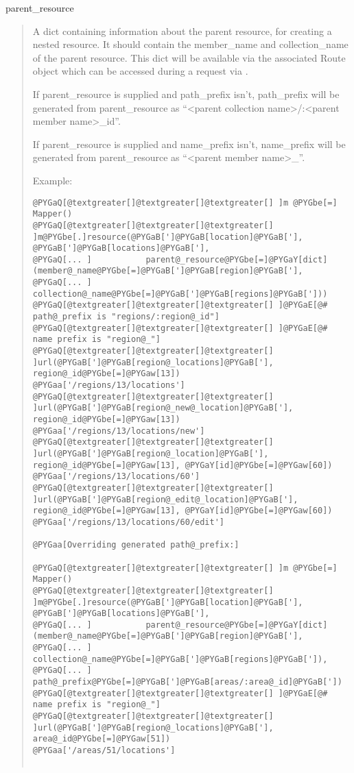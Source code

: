 \documentclass[letterpaper,10pt,english]{manual}
\begin{document}
parent\_resource
\begin{quote}

A dict containing information about the parent resource, for creating a
nested resource. It should contain the member\_name and collection\_name
of the parent resource. This dict will be available via the associated
Route object which can be accessed during a request via
.

If parent\_resource is supplied and path\_prefix isn't, path\_prefix will
be generated from parent\_resource as ``\textless{}parent collection name\textgreater{}/:\textless{}parent
member name\textgreater{}\_id''.

If parent\_resource is supplied and name\_prefix isn't, name\_prefix will
be generated from parent\_resource as ``\textless{}parent member name\textgreater{}\_''.

Example:

\begin{Verbatim}[commandchars=@\[\]]
@PYGaQ[@textgreater[]@textgreater[]@textgreater[] ]m @PYGbe[=] Mapper()
@PYGaQ[@textgreater[]@textgreater[]@textgreater[] ]m@PYGbe[.]resource(@PYGaB[']@PYGaB[location]@PYGaB['], @PYGaB[']@PYGaB[locations]@PYGaB['],
@PYGaQ[... ]           parent@_resource@PYGbe[=]@PYGaY[dict](member@_name@PYGbe[=]@PYGaB[']@PYGaB[region]@PYGaB['],
@PYGaQ[... ]                                collection@_name@PYGbe[=]@PYGaB[']@PYGaB[regions]@PYGaB[']))
@PYGaQ[@textgreater[]@textgreater[]@textgreater[] ]@PYGaE[@# path@_prefix is "regions/:region@_id"]
@PYGaQ[@textgreater[]@textgreater[]@textgreater[] ]@PYGaE[@# name prefix is "region@_"]
@PYGaQ[@textgreater[]@textgreater[]@textgreater[] ]url(@PYGaB[']@PYGaB[region@_locations]@PYGaB['], region@_id@PYGbe[=]@PYGaw[13])
@PYGaa['/regions/13/locations']
@PYGaQ[@textgreater[]@textgreater[]@textgreater[] ]url(@PYGaB[']@PYGaB[region@_new@_location]@PYGaB['], region@_id@PYGbe[=]@PYGaw[13])
@PYGaa['/regions/13/locations/new']
@PYGaQ[@textgreater[]@textgreater[]@textgreater[] ]url(@PYGaB[']@PYGaB[region@_location]@PYGaB['], region@_id@PYGbe[=]@PYGaw[13], @PYGaY[id]@PYGbe[=]@PYGaw[60])
@PYGaa['/regions/13/locations/60']
@PYGaQ[@textgreater[]@textgreater[]@textgreater[] ]url(@PYGaB[']@PYGaB[region@_edit@_location]@PYGaB['], region@_id@PYGbe[=]@PYGaw[13], @PYGaY[id]@PYGbe[=]@PYGaw[60])
@PYGaa['/regions/13/locations/60/edit']

@PYGaa[Overriding generated path@_prefix:]

@PYGaQ[@textgreater[]@textgreater[]@textgreater[] ]m @PYGbe[=] Mapper()
@PYGaQ[@textgreater[]@textgreater[]@textgreater[] ]m@PYGbe[.]resource(@PYGaB[']@PYGaB[location]@PYGaB['], @PYGaB[']@PYGaB[locations]@PYGaB['],
@PYGaQ[... ]           parent@_resource@PYGbe[=]@PYGaY[dict](member@_name@PYGbe[=]@PYGaB[']@PYGaB[region]@PYGaB['],
@PYGaQ[... ]                                collection@_name@PYGbe[=]@PYGaB[']@PYGaB[regions]@PYGaB[']),
@PYGaQ[... ]           path@_prefix@PYGbe[=]@PYGaB[']@PYGaB[areas/:area@_id]@PYGaB['])
@PYGaQ[@textgreater[]@textgreater[]@textgreater[] ]@PYGaE[@# name prefix is "region@_"]
@PYGaQ[@textgreater[]@textgreater[]@textgreater[] ]url(@PYGaB[']@PYGaB[region@_locations]@PYGaB['], area@_id@PYGbe[=]@PYGaw[51])
@PYGaa['/areas/51/locations']


\end{Verbatim}
\end{quote}
\end{document}
